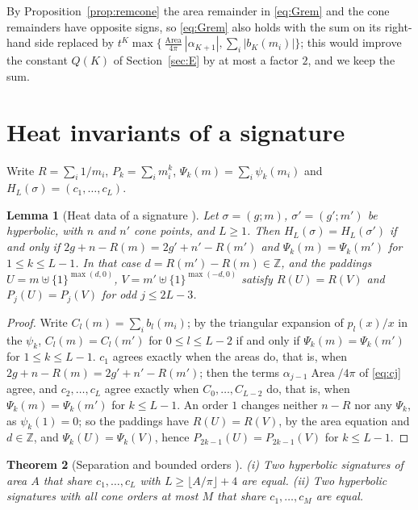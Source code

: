 \documentclass[pdflatex,sn-mathphys-num]{sn-jnl}
\theoremstyle{thmstyleone}%
\newtheorem{theorem}{Theorem}[section]%
\newtheorem{lemma}[theorem]{Lemma}%
\theoremstyle{thmstylethree}%
\newcommand{\Area}{\operatorname{Area}}
\newcommand{\Z}{\mathbb{Z}}
\begin{document}
By Proposition~\ref{prop:remcone} the area remainder in \eqref{eq:Grem} and the cone remainders have opposite signs, so \eqref{eq:Grem} also holds with the sum on its right-hand side replaced by $t^K\max\{\frac{\Area}{4\pi}|\alpha_{K+1}|,\sum_i|b_K(m_i)|\}$; this would improve the constant $Q(K)$ of Section~\ref{sec:E} by at most a factor $2$, and we keep the sum.

\section{Heat invariants of a signature}\label{sec:sig}

Write $R=\sum_i1/m_i$, $P_k=\sum_im_i^k$, $\Psi_k(m)=\sum_i\psi_k(m_i)$ and $H_L(\sigma)=(c_1,\dots,c_L)$.

\begin{lemma}[Heat data of a signature {\cite[Lemma~\ref*{A-lem:sigdata}]{companionA}}]\label{lem:sigdata}
Let $\sigma=(g;m)$, $\sigma'=(g';m')$ be hyperbolic, with $n$ and $n'$ cone points, and $L\ge1$. Then $H_L(\sigma)=H_L(\sigma')$ if and only if $2g+n-R(m)=2g'+n'-R(m')$ and $\Psi_k(m)=\Psi_k(m')$ for $1\le k\le L-1$. In that case $d=R(m')-R(m)\in\Z$, and the paddings $U=m\uplus\{1\}^{\max(d,0)}$, $V=m'\uplus\{1\}^{\max(-d,0)}$ satisfy $R(U)=R(V)$ and $P_j(U)=P_j(V)$ for odd $j\le2L-3$.
\end{lemma}

\begin{proof}
Write $C_l(m)=\sum_ib_l(m_i)$; by the triangular expansion of $p_l(x)/x$ in the $\psi_k$, $C_l(m)=C_l(m')$ for $0\le l\le L-2$ if and only if $\Psi_k(m)=\Psi_k(m')$ for $1\le k\le L-1$. $c_1$ agrees exactly when the areas do, that is, when $2g+n-R(m)=2g'+n'-R(m')$; then the terms $\alpha_{j-1}\Area/4\pi$ of \eqref{eq:cj} agree, and $c_2,\dots,c_L$ agree exactly when $C_0,\dots,C_{L-2}$ do, that is, when $\Psi_k(m)=\Psi_k(m')$ for $k\le L-1$. An order $1$ changes neither $n-R$ nor any $\Psi_k$, as $\psi_k(1)=0$; so the paddings have $R(U)=R(V)$, by the area equation and $d\in\Z$, and $\Psi_k(U)=\Psi_k(V)$, hence $P_{2k-1}(U)=P_{2k-1}(V)$ for $k\le L-1$.
\end{proof}

\begin{theorem}[Separation and bounded orders {\cite[Cor.~\ref*{A-cor:sigarea}, Thm~\ref*{A-thm:bounded}(i)]{companionA}}]\label{thm:sep}\label{thm:bounded}
(i) Two hyperbolic signatures of area $A$ that share $c_1,\dots,c_L$ with $L\ge\lfloor A/\pi\rfloor+4$ are equal. (ii) Two hyperbolic signatures with all cone orders at most $M$ that share $c_1,\dots,c_M$ are equal.
\end{theorem}
\end{document}
